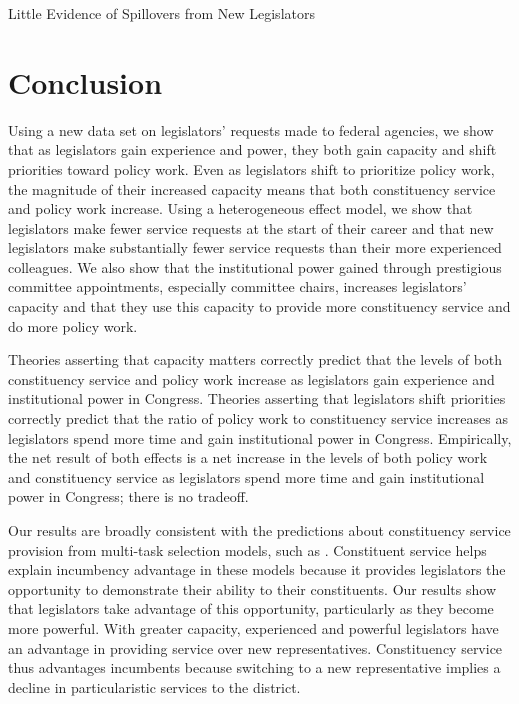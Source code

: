 \documentclass[12pt]{article}
\begin{document}
   

\begin{table}[hbt!]
\caption{Little Evidence of Spillovers from New Legislators} \label{t:spill1}

\begin{minipage}{\textwidth}
\begin{center}

\end{center}
\end{minipage}
\end{table}


\section{Conclusion} \label{s:conclude}
Using a new data set on legislators' requests made to federal agencies, we show that as legislators gain experience and power, they both gain capacity and shift priorities toward policy work. Even as legislators shift to prioritize policy work, the magnitude of their increased capacity means that both constituency service and policy work increase. Using a heterogeneous effect model, we show that legislators make fewer service requests at the start of their career and that new legislators make substantially fewer service requests than their more experienced colleagues. We also show that the institutional power gained through prestigious committee appointments, especially committee chairs, increases legislators' capacity and that they use this capacity to provide more constituency service and do more policy work.

Theories asserting that capacity matters correctly predict that the levels of both constituency service and policy work increase as legislators gain experience and institutional power in Congress.
Theories asserting that legislators shift priorities correctly predict that the ratio of policy work to constituency service increases as legislators spend more time and gain institutional power in Congress.
Empirically, the net result of both effects is a net increase in the levels of both policy work and constituency service as legislators spend more time and gain institutional power in Congress; there is no tradeoff.

Our results are broadly consistent with the predictions about constituency service provision from multi-task selection models, such as \cite{AshworthBuenodeMesquita2006}. Constituent service helps explain incumbency advantage in these models because it provides legislators the opportunity to demonstrate their ability to their constituents. Our results show that legislators take advantage of this opportunity, particularly as they become more powerful. With greater capacity, experienced and powerful legislators have an advantage in providing service over new representatives. Constituency service thus advantages incumbents because switching to a new representative implies a decline in particularistic services to the district. 
\end{document}
